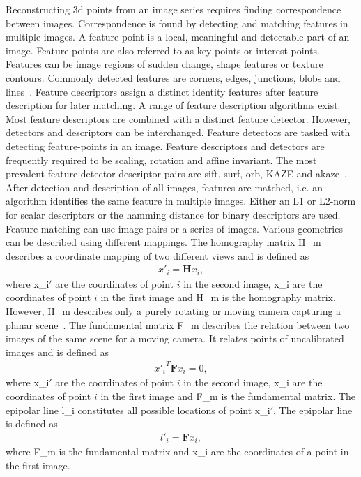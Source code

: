 Reconstructing \gls{3d} points from an image series requires finding correspondence between images. Correspondence is found by detecting and matching features in multiple images. A feature point is a local, meaningful and detectable part of an image. Feature points are also referred to as key-points or interest-points. Features can be image regions of sudden change, shape features or texture contours. Commonly detected features are corners, edges, junctions, blobs and lines~\cite{Tareen2018ABRISK}. Feature descriptors assign a distinct identity features after feature description for later matching. A range of feature description algorithms exist. Most feature descriptors are combined with a distinct feature detector. However, detectors and descriptors can be interchanged. Feature detectors are tasked with detecting feature-points in an image. Feature descriptors and detectors are frequently required to be scaling, rotation and affine invariant. The most prevalent feature detector-descriptor pairs are \gls{sift}, \gls{surf}, \gls{orb}, KAZE and \gls{akaze}~\cite{Tareen2018ABRISK}.
After detection and description of all images, features are matched, i.e. an algorithm identifies the same feature in multiple images. Either an L1 or L2-norm for scalar descriptors or the hamming distance for binary descriptors are used. Feature matching can use image pairs or a series of images. Various geometries can be described using different mappings. The homography matrix \gls{H_m} describes a coordinate mapping of two different views and is defined as
\begin{align}
    x'_i = \textbf{H}x_i, \label{eq:homography_m}
\end{align}
where \gls{x_i}$'$ are the coordinates of point $i$ in the second image, \gls{x_i} are the coordinates of point $i$ in the first image and \gls{H_m} is the homography matrix. However, \gls{H_m} describes only a purely rotating or moving camera capturing a planar scene~\cite{schonberger2016structure}. The fundamental matrix \gls{F_m} describes the relation between two images of the same scene for a moving camera. It relates points of uncalibrated images and is defined as
\begin{align}
    {x'_i}^{T}\textbf{F}x_i = 0, \label{eq:fundamental_m}
\end{align}
where \gls{x_i}$'$ are the coordinates of point $i$ in the second image, \gls{x_i} are the coordinates of point $i$ in the first image and \gls{F_m} is the fundamental matrix. The epipolar line \gls{l_i} constitutes all possible locations of point \gls{x_i}$'$. The epipolar line is defined as
\begin{align}
    l'_i = \textbf{F}x_i, \label{eq:epipolar_l}
\end{align}
where \gls{F_m} is the fundamental matrix and \gls{x_i} are the coordinates of a point in the first image.

